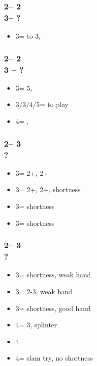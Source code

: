 \documentclass[12pt, a4paper]{article}
\begin{document}
\subsubsection*{2\hearts -- 2\nt\\
                3\clubs -- ?}
\begin{itemize}
    \item 3\diams = \inv to 3\nt, \nat
\end{itemize}

\subsubsection*{2\hearts -- 2\nt\\
                3 -- ?}
\begin{itemize}
    \item 3\spades = 5\spades, \gf
    \item 3\hearts/3\nt/4\major/5\minor = to play
    \item 4\nt = \inv, \nat
\end{itemize}

\subsubsection*{2\hearts -- 3\clubs\\
                ?}
\begin{itemize}
    \item 3\diams = 2+\clubs, 2+\diams
    \item 3\hearts = 2+\clubs, 2+\diams, \spades shortness
    \item 3\spades = \clubs shortness
    \item 3\nt = \diams shortness
\end{itemize}

\subsubsection*{2\hearts -- 3\diams\\
                ?}
\begin{itemize}
    \item 3\hearts = \spades shortness, weak hand
    \item 3\spades = 2-3\spades, weak hand
    \item 3\nt = \spades shortness, good hand
    \item 4\minor = 3\spades, splinter
    \item 4\hearts = \spades
    \item 4\spades = slam try, no shortness
\end{itemize}
\end{document}
